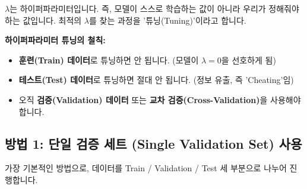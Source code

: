 \documentclass[11pt,a4paper]{book}
\theoremstyle{definition}
\begin{document}
$\lambda$는 하이퍼파라미터입니다. 즉, 모델이 스스로 학습하는 값이 아니라 우리가 정해줘야 하는 값입니다. 최적의 $\lambda$를 찾는 과정을 '튜닝(Tuning)'이라고 합니다.

\begin{warningbox}
\textbf{하이퍼파라미터 튜닝의 철칙:}
\begin{itemize}
    \item \textbf{훈련(Train) 데이터}로 튜닝하면 안 됩니다. (모델이 $\lambda=0$을 선호하게 됨)
    \item \textbf{테스트(Test) 데이터}로 튜닝하면 절대 안 됩니다. (정보 유출, 즉 'Cheating'임)
    \item 오직 \textbf{검증(Validation) 데이터} 또는 \textbf{교차 검증(Cross-Validation)}을 사용해야 합니다.
\end{itemize}
\end{warningbox}

\subsection{방법 1: 단일 검증 세트 (Single Validation Set) 사용}

가장 기본적인 방법으로, 데이터를 Train / Validation / Test 세 부분으로 나누어 진행합니다.
\end{document}
